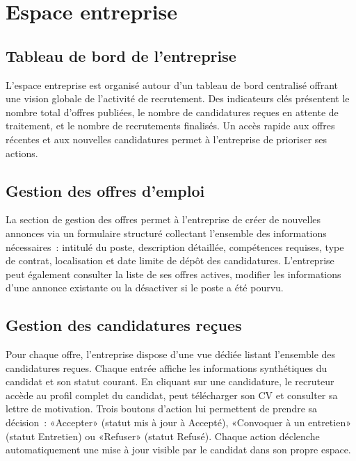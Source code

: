 \documentclass[12pt,a4paper]{report}
\begin{document}
\section{Espace entreprise}

\subsection{Tableau de bord de l'entreprise}

L'espace entreprise est organisé autour d'un tableau de bord centralisé offrant une vision globale de l'activité de recrutement. Des indicateurs clés présentent le nombre total d'offres publiées, le nombre de candidatures reçues en attente de traitement, et le nombre de recrutements finalisés. Un accès rapide aux offres récentes et aux nouvelles candidatures permet à l'entreprise de prioriser ses actions.

\subsection{Gestion des offres d'emploi}

La section de gestion des offres permet à l'entreprise de créer de nouvelles annonces via un formulaire structuré collectant l'ensemble des informations nécessaires~: intitulé du poste, description détaillée, compétences requises, type de contrat, localisation et date limite de dépôt des candidatures. L'entreprise peut également consulter la liste de ses offres actives, modifier les informations d'une annonce existante ou la désactiver si le poste a été pourvu.

\subsection{Gestion des candidatures reçues}

Pour chaque offre, l'entreprise dispose d'une vue dédiée listant l'ensemble des candidatures reçues. Chaque entrée affiche les informations synthétiques du candidat et son statut courant. En cliquant sur une candidature, le recruteur accède au profil complet du candidat, peut télécharger son CV et consulter sa lettre de motivation. Trois boutons d'action lui permettent de prendre sa décision~: «Accepter» (statut mis à jour à Accepté), «Convoquer à un entretien» (statut Entretien) ou «Refuser» (statut Refusé). Chaque action déclenche automatiquement une mise à jour visible par le candidat dans son propre espace.
\end{document}
